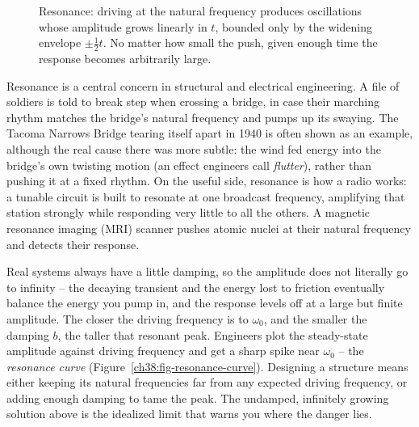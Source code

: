 \begin{figure}[htbp]
\centering
{}
\caption{Resonance: driving at the natural frequency produces oscillations whose
amplitude grows linearly in $t$, bounded only by the widening envelope $\pm
\tfrac12 t$. No matter how small the push, given enough time the response becomes
arbitrarily large.}
\label{ch38:fig-resonance}
\end{figure}

\begin{aestheticbox}
Resonance is a central concern in structural and electrical engineering. A file
of soldiers is told to break step when crossing a bridge, in case their marching
rhythm matches the bridge's natural frequency and pumps up its swaying. The
Tacoma Narrows Bridge tearing itself apart in 1940 is often shown as an example,
although the real cause there was more subtle: the wind fed energy into the
bridge's own twisting motion (an effect engineers call \emph{flutter}), rather
than pushing it at a fixed rhythm. On the useful side, resonance is
how a radio works: a tunable circuit is built to resonate at one broadcast
frequency, amplifying that station strongly while responding very little to all
the others. A magnetic resonance imaging (MRI) scanner pushes atomic nuclei at
their natural frequency and detects their response.
\end{aestheticbox}

\begin{applicationbox}
Real systems always have a little damping, so the amplitude does not literally go
to infinity -- the decaying transient and the energy lost to friction eventually
balance the energy you pump in, and the response levels off at a large but finite
amplitude. The closer the driving frequency is to $\omega_0$, and the smaller the
damping $b$, the taller that resonant peak. Engineers plot the steady-state
amplitude against driving frequency and get a sharp spike near $\omega_0$ -- the
\emph{resonance curve} (Figure~\ref{ch38:fig-resonance-curve}). Designing a structure means either keeping its natural
frequencies far from any expected driving frequency, or adding enough damping to
tame the peak. The undamped, infinitely growing solution above is the idealized
limit that warns you where the danger lies.
\end{applicationbox}

